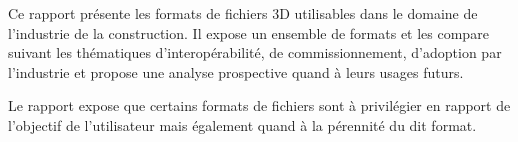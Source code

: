 Ce rapport présente les formats de fichiers 3D utilisables dans le domaine de l'industrie de la construction. Il expose un ensemble de formats et les compare suivant les thématiques d'interopérabilité, de commissionnement, d'adoption par l'industrie et propose une analyse prospective quand à leurs usages futurs.

Le rapport expose que certains formats de fichiers sont à privilégier en rapport de l'objectif de l'utilisateur mais également quand à la pérennité du dit format.
